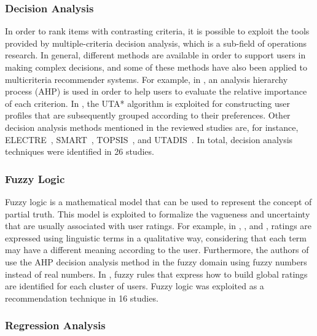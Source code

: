 \subsubsection{Decision Analysis}

In order to rank items with contrasting criteria, it is possible to exploit the tools provided by multiple-criteria decision analysis, which is a sub-field of operations research. In general, different methods are available in order to support users in making complex decisions, and some of these methods have also been applied to multicriteria recommender systems. For example, in , an analysis hierarchy process (AHP) is used in order to help users to evaluate the relative importance of each criterion. In , the UTA* algorithm is exploited for constructing user profiles that are subsequently grouped according to their preferences. Other decision analysis methods mentioned in the reviewed studies are, for instance, ELECTRE~, SMART~, TOPSIS~, and UTADIS~. In total, decision analysis techniques were identified in 26 studies.

\subsubsection{Fuzzy Logic}

Fuzzy logic is a mathematical model that can be used to represent the concept of partial truth. This model is exploited to formalize the vagueness and uncertainty that are usually associated with user ratings. For example, in , , and , ratings are expressed using linguistic terms in a qualitative way, considering that each term may have a different meaning according to the user. Furthermore, the authors of  use the AHP decision analysis method in the fuzzy domain using fuzzy numbers instead of real numbers. In , fuzzy rules that express how to build global ratings are identified for each cluster of users. Fuzzy logic was exploited as a recommendation technique in 16 studies.

\subsubsection{Regression Analysis}

